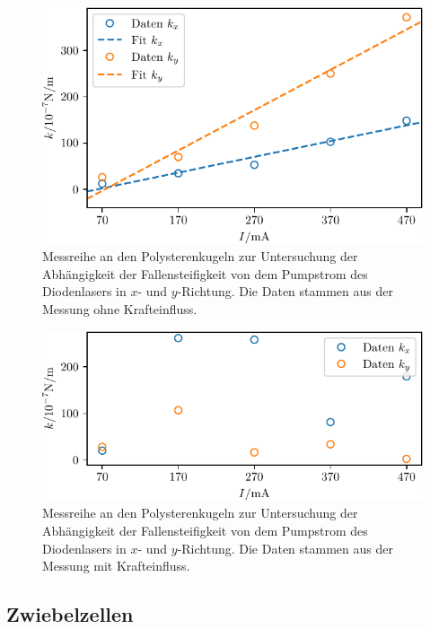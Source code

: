 \begin{figure}
  \centering
  \includegraphics[scale = 1]{../analysis/data/ii_polysteren/k_power_series.pdf}
  \caption{Messreihe an den Polysterenkugeln zur Untersuchung der Abhängigkeit der Fallensteifigkeit von dem Pumpstrom des Diodenlasers
  in $x$- und $y$-Richtung. Die Daten stammen aus der Messung ohne Krafteinfluss.}
  \label{fig: poly_k_power}
\end{figure}
\begin{figure}
  \centering
  \includegraphics[scale = 1]{../analysis/data/ii_polysteren/k_power_series_force.pdf}
  \caption{Messreihe an den Polysterenkugeln zur Untersuchung der Abhängigkeit der Fallensteifigkeit von dem Pumpstrom des Diodenlasers
  in $x$- und $y$-Richtung. Die Daten stammen aus der Messung mit Krafteinfluss. }
  \label{fig: poly_k_power_series_force}
\end{figure}

\FloatBarrier

\subsection{Zwiebelzellen}
